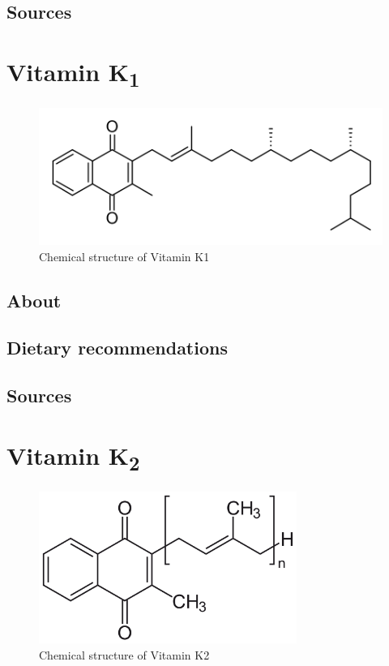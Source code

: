 \documentclass{book}
\begin{document}
\begin{sloppypar}
\section{Sources}


\chapter{Vitamin K\texorpdfstring{\textsubscript{1}}{1}}
\begin{figure}[h]
	\caption{Chemical structure of Vitamin K1}
	\centering \includegraphics[width=\textwidth]{images/Vitamin_K1_chemical_structure}
\end{figure}
\newpage

\section{About}


\section{Dietary recommendations}


\section{Sources}


\chapter{Vitamin K\texorpdfstring{\textsubscript{2}}{2}}
\begin{figure}[h]
	\caption{Chemical structure of Vitamin K2}
	\centering \includegraphics[width=0.75\textwidth]{images/Vitamin_K2_chemical_structure}
\end{figure}
\newpage


\end{sloppypar}
\end{document}
